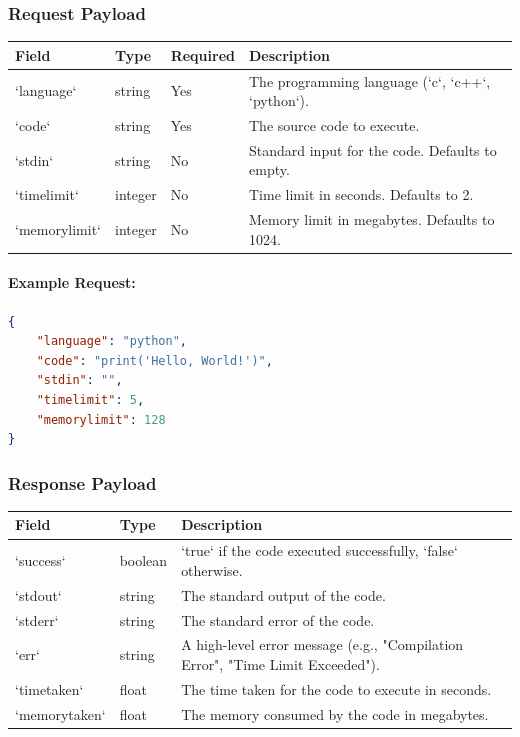 \documentclass{article}
\begin{document}
\subsubsection*{Request Payload}
\begin{tabularx}{\textwidth}{|l|l|l|X|}
    \hline
    \textbf{Field} & \textbf{Type} & \textbf{Required} & \textbf{Description} \\
    \hline
    `language` & string & Yes & The programming language (`c`, `c++`, `python`). \\
    \hline
    `code` & string & Yes & The source code to execute. \\
    \hline
    `stdin` & string & No & Standard input for the code. Defaults to empty. \\
    \hline
    `timelimit` & integer & No & Time limit in seconds. Defaults to 2. \\
    \hline
    `memorylimit` & integer & No & Memory limit in megabytes. Defaults to 1024. \\
    \hline
\end{tabularx}

\paragraph{Example Request:}
\begin{lstlisting}[language=json, caption=Example Request]
{
    "language": "python",
    "code": "print('Hello, World!')",
    "stdin": "",
    "timelimit": 5,
    "memorylimit": 128
}
\end{lstlisting}

\subsubsection*{Response Payload}
\begin{tabularx}{\textwidth}{|l|l|X|}
    \hline
    \textbf{Field} & \textbf{Type} & \textbf{Description} \\
    \hline
    `success` & boolean & `true` if the code executed successfully, `false` otherwise. \\
    \hline
    `stdout` & string & The standard output of the code. \\
    \hline
    `stderr` & string & The standard error of the code. \\
    \hline
    `err` & string & A high-level error message (e.g., "Compilation Error", "Time Limit Exceeded"). \\
    \hline
    `timetaken` & float & The time taken for the code to execute in seconds. \\
    \hline
    `memorytaken` & float & The memory consumed by the code in megabytes. \\
    \hline
\end{tabularx}
\end{document}
